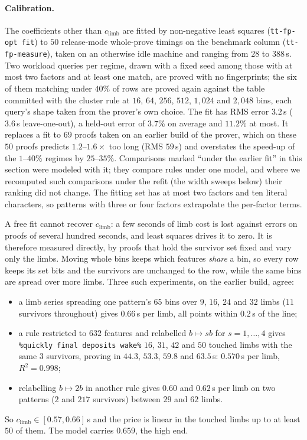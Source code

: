 \paragraph{Calibration.}
The coefficients other than $c_{\mathrm{limb}}$ are fitted by
non-negative least squares (\texttt{tt-fp-opt fit}) to $50$ release-mode
whole-prove timings on the benchmark column (\texttt{tt-fp-measure}),
taken on an otherwise idle machine and ranging from $28$ to $388$\,s. Two
workload queries per regime, drawn with a fixed seed among those with at
most two factors and at least one match, are proved with no
fingerprints; the six of them matching under $40\%$ of rows are proved
again against the table committed with the cluster rule at $16$, $64$,
$256$, $512$, $1{,}024$ and $2{,}048$ bins, each query's shape taken from
the prover's own choice. The fit has RMS error $3.2$\,s ($3.6$\,s
leave-one-out), a held-out error of $3.7\%$ on average and $11.2\%$ at
most. It replaces a fit to $69$ proofs taken on an earlier build of the
prover, which on these $50$ proofs predicts $1.2$--$1.6\times$ too long
(RMS $59$\,s) and overstates the speed-up of the $1$--$40\%$ regimes by
$25$--$35\%$. Comparisons marked ``under the earlier fit'' in this
section were modeled with it; they compare rules under one model, and
where we recomputed such comparisons under the refit (the width sweeps
below) their ranking did not change. The fitting set has at most two factors and ten
literal characters, so patterns with three or four factors extrapolate
the per-factor terms.

A free fit cannot recover $c_{\mathrm{limb}}$: a few seconds of limb cost
is lost against errors on proofs of several hundred seconds, and least
squares drives it to zero. It is therefore measured directly, by proofs
that hold the survivor set fixed and vary only the limbs. Moving whole
bins keeps which features \emph{share} a bin, so every row keeps its set
bits and the survivors are unchanged to the row, while the same bins are
spread over more limbs. Three such experiments, on the earlier build,
agree:
\begin{itemize}
  \item a limb series spreading one pattern's $65$ bins over $9$, $16$,
        $24$ and $32$ limbs ($11$ survivors throughout) gives $0.66$\,s
        per limb, all points within $0.2$\,s of the line;
  \item a rule restricted to $632$ features and relabelled
        $b \mapsto sb$ for $s = 1, \dots, 4$ gives \texttt{\%quickly final
        deposits wake\%} $16$, $31$, $42$ and $50$ touched limbs with the
        same $3$ survivors, proving in $44.3$, $53.3$, $59.8$ and
        $63.5$\,s: $0.570$\,s per limb, $R^2 = 0.998$;
  \item relabelling $b \mapsto 2b$ in another rule gives $0.60$ and
        $0.62$\,s per limb on two patterns ($2$ and $217$ survivors)
        between $29$ and $62$ limbs.
\end{itemize}
So $c_{\mathrm{limb}} \in [0.57, 0.66]$\,s and the price is linear in the
touched limbs up to at least $50$ of them. The model carries $0.659$, the
high end.

